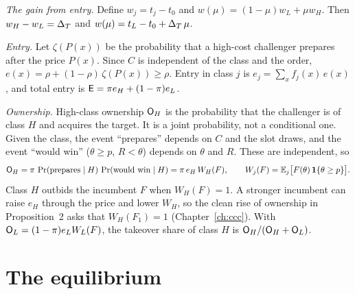 \emph{The gain from entry.} Define \(w_j=t_j-t_0\) and \(w(\mu)=(1-\mu)w_L+\mu w_H\). Then \(w_H-w_L=\Delta_T\) and \(w(\mu)=t_L-t_0+\Delta_T\,\mu\).

\emph{Entry.} Let \(\zeta(P(x))\) be the probability that a high-cost challenger prepares after the price \(P(x)\). Since \(C\) is independent of the class and the order, \(e(x)=\rho+(1-\rho)\,\zeta(P(x))\ge\rho\).
Entry in class \(j\) is \(e_j=\sum_xf_j(x)\,e(x)\), and total entry is \(\mathsf{E}=\pi e_H+(1-\pi)e_L\).

\emph{Ownership.} High-class ownership \(\mathsf{O}_H\) is the probability that the challenger is of class \(H\) and acquires the target. It is a joint probability, not a conditional one.
Given the class, the event ``prepares'' depends on \(C\) and the slot draws, and the event ``would win'' (\(\theta\ge p\), \(R<\theta\)) depends on \(\theta\) and \(R\). These are independent, so
\[
\mathsf{O}_H=\pi\,\Pr(\text{prepares}\mid H)\,\Pr(\text{would win}\mid H)=\pi\,e_H\,W_H(F),\qquad W_j(F)=\mathbb{E}_j\bigl[F(\theta)\,\mathbf{1}\{\theta\ge p\}\bigr].
\]
Class \(H\) outbids the incumbent \(F\) when \(W_H(F)=1\).
A stronger incumbent can raise \(e_H\) through the price and lower \(W_H\), so the clean rise of ownership in Proposition~2 asks that \(W_H(F_1)=1\) (Chapter~\ref{ch:ccc}).
With \(\mathsf{O}_L=(1-\pi)e_LW_L(F)\), the takeover share of class \(H\) is \(\mathsf{O}_H/(\mathsf{O}_H+\mathsf{O}_L)\).

\section{The equilibrium}\label{sec:model-equilibrium}

